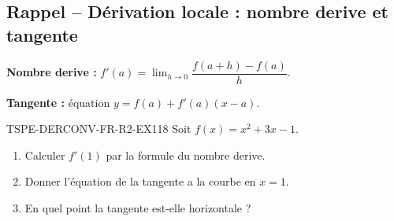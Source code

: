 

\subsection*{Rappel -- Dérivation locale : nombre derive et tangente}

\textbf{Nombre derive :} $f'(a) = \lim_{h \to 0} \dfrac{f(a+h) - f(a)}{h}$.

\textbf{Tangente :} équation $y = f(a) + f'(a)(x - a)$.

\begin{exercice}{TSPE-DERCONV-FR-R2-EX1}{1}{8}
Soit $f(x) = x^2 + 3x - 1$.
\begin{enumerate}
  \item Calculer $f'(1)$ par la formule du nombre derive.
  \item Donner l'équation de la tangente a la courbe en $x = 1$.
  \item En quel point la tangente est-elle horizontale ?
\end{enumerate}
\end{exercice}

